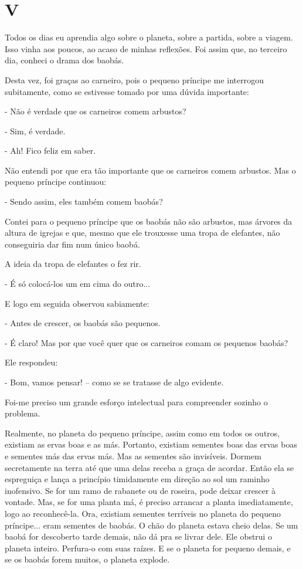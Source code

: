 \chapter{V}

Todos os dias eu aprendia algo sobre o planeta, sobre a partida, sobre a
viagem. Isso vinha aos poucos, ao acaso de minhas reflexões. Foi assim
que, no terceiro dia, conheci o drama dos baobás.

Desta vez, foi graças ao carneiro, pois o pequeno príncipe me interrogou
subitamente, como se estivesse tomado por uma dúvida importante:

- Não é verdade que os carneiros comem arbustos?

- Sim, é verdade.

- Ah! Fico feliz em saber.

Não entendi por que era tão importante que os carneiros comem arbustos.
Mas o pequeno príncipe continuou:

- Sendo assim, eles também comem baobás?

Contei para o pequeno príncipe que os baobás não são arbustos, mas
árvores da altura de igrejas e que, mesmo que ele trouxesse uma tropa de
elefantes, não conseguiria dar fim num único baobá.

A ideia da tropa de elefantes o fez rir.

- É só colocá-los um em cima do outro...

E logo em seguida observou sabiamente:

- Antes de crescer, os baobás são pequenos.

- É claro! Mas por que você quer que os carneiros comam os pequenos
baobás?

Ele respondeu:

- Bom, vamos pensar! -- como se se tratasse de algo evidente.

Foi-me preciso um grande esforço intelectual para compreender sozinho o
problema.

Realmente, no planeta do pequeno príncipe, assim como em todos os
outros, existiam as ervas boas e as más. Portanto, existiam sementes
boas das ervas boas e sementes más das ervas más. Mas as sementes são
invisíveis. Dormem secretamente na terra até que uma delas receba a
graça de acordar. Então ela se espreguiça e lança a princípio
timidamente em direção ao sol um raminho inofensivo. Se for um ramo de
rabanete ou de roseira, pode deixar crescer à vontade. Mas, se for uma
planta má, é preciso arrancar a planta imediatamente, logo ao
reconhecê-la. Ora, existiam sementes terríveis no planeta do pequeno
príncipe... eram sementes de baobás. O chão do planeta estava cheio
delas. Se um baobá for descoberto tarde demais, não dá pra se livrar
dele. Ele obstrui o planeta inteiro. Perfura-o com suas raízes. E se o
planeta for pequeno demais, e se os baobás forem muitos, o planeta
explode.

